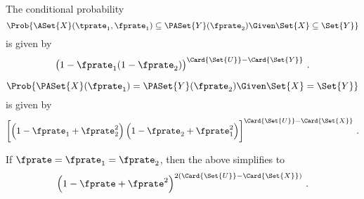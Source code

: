 \documentclass[ ../main.tex]{subfiles}
\begin{document}
The conditional probability
\begin{equation}
\Prob{\ASet{X}(\tprate_1,\fprate_1) \subseteq \PASet{Y}(\fprate_2) \Given \Set{X} \subseteq \Set{Y}}
\end{equation}
is given by
\begin{equation}
\left(1 - \fprate_1(1 - \fprate_2)\right)^{\Card{\Set{U}} - \Card{\Set{Y}}}\,.
\end{equation}


\begin{equation}
\Prob{\PASet{X}(\fprate_1) = \PASet{Y}(\fprate_2) \Given \Set{X} = \Set{Y}}
\end{equation}
is given by
\begin{equation}
\left[\left(1 - \fprate_1 + \fprate_2^2\right)\left(1 - \fprate_2 + \fprate_1^2\right)\right]^{\Card{\Set{U}} - \Card{\Set{X}}}\,.
\end{equation}

If $\fprate = \fprate_1 = \fprate_2$, then the above simplifies to
\begin{equation}
\left(1 - \fprate + \fprate^2\right)^{2 (\Card{\Set{U}} - \Card{\Set{X}})}\,.
\end{equation}





\end{document}
